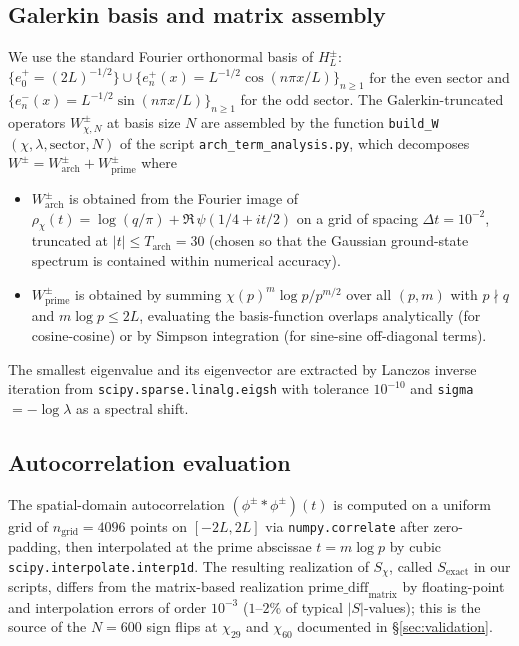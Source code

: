 \documentclass[10pt,twocolumn]{article}
\theoremstyle{definition}
\theoremstyle{remark}
\newcommand{\chifn}{\chi}
\begin{document}
\subsection{Galerkin basis and matrix assembly}
We use the standard Fourier orthonormal basis of $H_L^\pm$:
$\{e_0^+=(2L)^{-1/2}\}\cup\{e_n^+(x)=L^{-1/2}\cos(n\pi x/L)\}_{n\geq 1}$
for the even sector and
$\{e_n^-(x)=L^{-1/2}\sin(n\pi x/L)\}_{n\geq 1}$ for the odd sector.
The Galerkin-truncated operators $W^{\pm}_{\chifn,N}$ at basis size
$N$ are assembled by the function
\texttt{build\_W}$(\chifn,\lambda,\mathrm{sector},N)$ of the script
\texttt{arch\_term\_analysis.py}, which decomposes
$W^\pm = W^\pm_{\mathrm{arch}} + W^\pm_{\mathrm{prime}}$ where
\begin{itemize}
\item[(i)] $W^\pm_{\mathrm{arch}}$ is obtained from the Fourier image
  of $\rho_{\chifn}(t)=\log(q/\pi)+\Re\,\psi(1/4+it/2)$ on a grid of
  spacing $\Delta t=10^{-2}$, truncated at $|t|\leq T_{\mathrm{arch}}=
  30$ (chosen so that the Gaussian ground-state spectrum is contained
  within numerical accuracy).
\item[(ii)] $W^\pm_{\mathrm{prime}}$ is obtained by summing
  $\chifn(p)^m\log p/p^{m/2}$ over all $(p,m)$ with $p\nmid q$ and
  $m\log p\leq 2L$, evaluating the basis-function overlaps
  analytically (for cosine-cosine) or by Simpson integration (for
  sine-sine off-diagonal terms).
\end{itemize}
The smallest eigenvalue and its eigenvector are extracted by
Lanczos inverse iteration from \texttt{scipy.sparse.linalg.eigsh}
with tolerance $10^{-10}$ and \texttt{sigma}$=-\log\lambda$ as a
spectral shift.

\subsection{Autocorrelation evaluation}
The spatial-domain autocorrelation
$(\phi^\pm\ast\phi^\pm)(t)$ is computed on a uniform grid of $n_{
\mathrm{grid}}=4096$ points on $[-2L,2L]$ via \texttt{numpy.correlate}
after zero-padding, then interpolated at the prime abscissae
$t=m\log p$ by cubic \texttt{scipy.interpolate.interp1d}. The
resulting realization of $S_{\chifn}$, called $S_{\mathrm{exact}}$
in our scripts, differs from the matrix-based realization
$\mathrm{prime\_diff}_{\mathrm{matrix}}$ by floating-point and
interpolation errors of order $10^{-3}$ ($1$--$2\%$ of typical
$|S|$-values); this is the source of the $N=600$ sign flips at
$\chifn_{29}$ and $\chifn_{60}$ documented in
\S\ref{sec:validation}.
\end{document}
